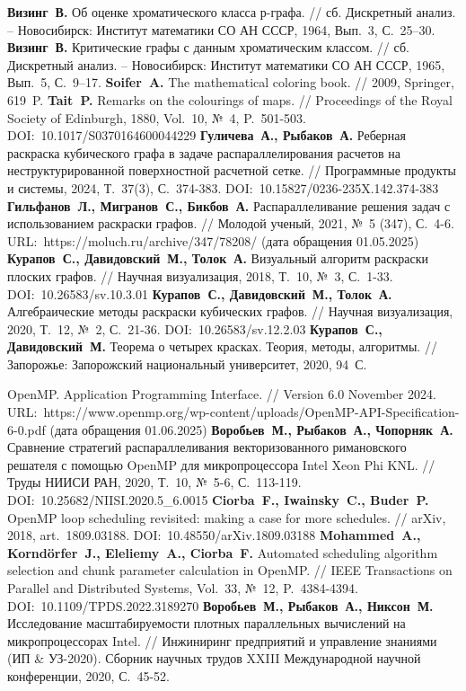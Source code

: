\begin{thebibliography}{99}
%
\textbf{Визинг~В.} Об оценке хроматического класса р-графа. // сб. Дискретный анализ. -- Новосибирск: Институт математики СО АН СССР, 1964, Вып.~3, С.~25–30.
%
\textbf{Визинг~В.} Критические графы с данным хроматическим классом. // сб. Дискретный анализ. -- Новосибирск: Институт математики СО АН СССР, 1965, Вып.~5, С.~9–17.
%
\textbf{Soifer~A.} The mathematical coloring book. // 2009, Springer, 619~P.
%
\textbf{Tait~P.} Remarks on the colourings of maps. // Proceedings of the Royal Society of Edinburgh, 1880, Vol.~10, №~4, P.~501-503. DOI:~10.1017/S0370164600044229
%
\textbf{Гуличева~А., Рыбаков~А.} Реберная раскраска кубического графа в задаче распараллелирования расчетов на неструктурированной поверхностной расчетной сетке. // Программные продукты и системы, 2024, Т.~37(3), С.~374-383. DOI:~10.15827/0236-235X.142.374-383
%
\textbf{Гильфанов~Л., Мигранов~С., Бикбов~А.} Распараллеливание решения задач с использованием раскраски графов. // Молодой ученый, 2021, №~5 (347), С.~4-6. URL:~https://moluch.ru/archive/347/78208/ (дата обращения 01.05.2025)
%
\textbf{Курапов~С., Давидовский~М., Толок~А.} Визуальный алгоритм раскраски плоских графов. // Научная визуализация, 2018, Т.~10, №~3, С.~1-33. DOI:~10.26583/sv.10.3.01
%
\textbf{Курапов~С., Давидовский~М., Толок~А.} Алгебраические методы раскраски кубических графов. // Научная визуализация, 2020, Т.~12, №~2, С.~21-36. DOI:~10.26583/sv.12.2.03
%
\textbf{Курапов~С., Давидовский~М.} Теорема о четырех красках. Теория, методы, алгоритмы. // Запорожье: Запорожский национальный университет, 2020, 94~С.
%



%
OpenMP. Application Programming Interface. // Version 6.0 November 2024. URL:~https://www.openmp.org/wp-content/uploads/OpenMP-API-Specification-6-0.pdf (дата обращения 01.06.2025)
%
\textbf{Воробьев~М., Рыбаков~А., Чопорняк~А.} Сравнение стратегий распараллеливания векторизованного римановского решателя с помощью OpenMP для микропроцессора Intel Xeon Phi KNL. // Труды НИИСИ РАН, 2020, Т.~10, №~5-6, С.~113-119. DOI:~10.25682/NIISI.2020.5\_6.0015
%
\textbf{Ciorba~F., Iwainsky~C., Buder~P.} OpenMP loop scheduling revisited: making a case for more schedules. // arXiv, 2018, art.~1809.03188. DOI:~10.48550/arXiv.1809.03188
%
\textbf{Mohammed~A., Kornd{\"o}rfer~J., Eleliemy~A., Ciorba~F.} Automated scheduling algorithm selection and chunk parameter calculation in OpenMP. // IEEE Transactions on Parallel and Distributed Systems, Vol.~33, №~12, P.~4384-4394. DOI:~10.1109/TPDS.2022.3189270
%
\textbf{Воробьев~М., Рыбаков~А., Никсон~М.} Исследование масштабируемости плотных параллельных вычислений на микропроцессорах Intel. // Инжиниринг предприятий и управление знаниями (ИП \& УЗ-2020). Сборник научных трудов XXIII Международной научной конференции, 2020, С.~45-52.
%




\end{thebibliography}
